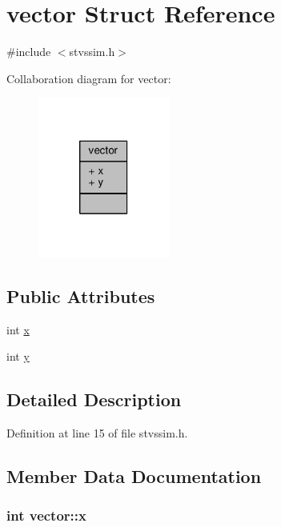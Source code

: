 \hypertarget{structvector}{\section{vector Struct Reference}
\label{structvector}
}


{\ttfamily \#include $<$stvssim.\-h$>$}



Collaboration diagram for vector\-:
\nopagebreak
\begin{figure}[H]
\begin{center}
\leavevmode
\includegraphics[width=122pt]{structvector__coll__graph}
\end{center}
\end{figure}
\subsection*{Public Attributes}
\begin{DoxyCompactItemize}
\item 
int \hyperlink{structvector_a0403eb3aea23a3009e276fba1d317046}{x}
\item 
int \hyperlink{structvector_aad6de640298eae97ca0a094db5aff477}{y}
\end{DoxyCompactItemize}


\subsection{Detailed Description}


Definition at line 15 of file stvssim.\-h.



\subsection{Member Data Documentation}
\hypertarget{structvector_a0403eb3aea23a3009e276fba1d317046}{
\subsubsection[{x}]{\setlength{\rightskip}{0pt plus 5cm}int vector\-::x}}\label{structvector_a0403eb3aea23a3009e276fba1d317046}


